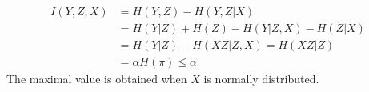 \begin{exercise}
\begin{solution}
\begin{enumerate}
{    \begin{equation}
      \begin{aligned}
        I(Y,Z;X) &= H(Y,Z) - H(Y,Z|X) \\
        &= H(Y|Z) + H(Z) - H(Y|Z,X) - H(Z|X) \\
        &= H(Y|Z) - H(XZ|Z,X) = H(XZ|Z) \\
        &= \alpha H(\pi) \le \alpha
       \end{aligned}
    \end{equation}
    The maximal value is obtained when $X$ is normally distributed.
    }
  \end{enumerate}
  \end{solution}
  \label{ex3}
\end{exercise}

